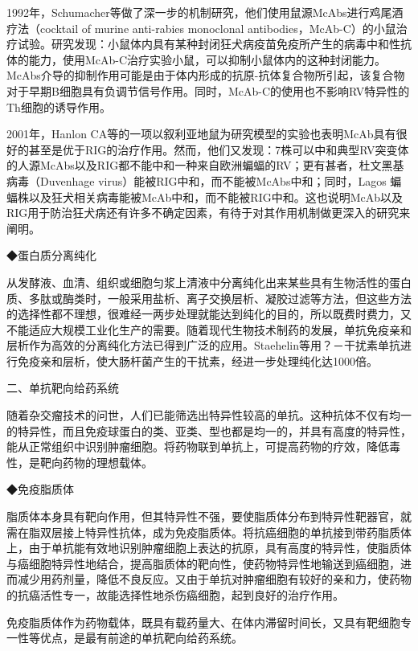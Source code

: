 1992年，Schumacher等做了深一步的机制研究，他们使用鼠源McAbs进行鸡尾酒疗法（cocktail
of murine anti-rabies monoclonal
antibodies，McAb-C）的小鼠治疗试验。研究发现：小鼠体内具有某种封闭狂犬病疫苗免疫所产生的病毒中和性抗体的能力，使用McAb-C治疗实验小鼠，可以抑制小鼠体内的这种封闭能力。McAbs介导的抑制作用可能是由于体内形成的抗原-抗体复合物所引起，该复合物对于早期B细胞具有负调节信号作用。同时，McAb-C的使用也不影响RV特异性的Th细胞的诱导作用。

2001年，Hanlon
CA等的一项以叙利亚地鼠为研究模型的实验也表明McAb具有很好的甚至是优于RIG的治疗作用。然而，他们又发现：7株可以中和典型RV突变体的人源McAbs以及RIG都不能中和一种来自欧洲蝙蝠的RV；更有甚者，杜文黑基病毒（Duvenhage
virus）能被RIG中和，而不能被McAbs中和；同时，Lagos
蝙蝠株以及狂犬相关病毒能被McAb中和，而不能被RIG中和。这也说明McAb以及RIG用于防治狂犬病还有许多不确定因素，有待于对其作用机制做更深入的研究来阐明。

◆蛋白质分离纯化

从发酵液、血清、组织或细胞匀浆上清液中分离纯化出来某些具有生物活性的蛋白质、多肽或酶类时，一般采用盐析、离子交换层析、凝胶过滤等方法，但这些方法的选择性都不理想，很难经一两步处理就能达到纯化的目的，所以既费时费力，又不能适应大规模工业化生产的需要。随着现代生物技术制药的发展，单抗免疫亲和层析作为高效的分离纯化方法已得到广泛的应用。Staehelin等用？－干扰素单抗进行免疫亲和层析，使大肠杆菌产生的干扰素，经进一步处理纯化达1000倍。

\begin{center}
    {\large 二、单抗靶向给药系统}
    \end{center}


随着杂交瘤技术的问世，人们已能筛选出特异性较高的单抗。这种抗体不仅有均一的特异性，而且免疫球蛋白的类、亚类、型也都是均一的，并具有高度的特异性，能从正常组织中识别肿瘤细胞。将药物联到单抗上，可提高药物的疗效，降低毒性，是靶向药物的理想载体。

◆免疫脂质体

脂质体本身具有靶向作用，但其特异性不强，要使脂质体分布到特异性靶器官，就需在脂双层接上特异性抗体，成为免疫脂质体。将抗癌细胞的单抗接到带药脂质体上，由于单抗能有效地识别肿瘤细胞上表达的抗原，具有高度的特异性，使脂质体与癌细胞特异性地结合，提高脂质体的靶向性，使药物特异性地输送到癌细胞，进而减少用药剂量，降低不良反应。又由于单抗对肿瘤细胞有较好的亲和力，使药物的抗癌活性专一，故能选择性地杀伤癌细胞，起到良好的治疗作用。

免疫脂质体作为药物载体，既具有载药量大、在体内滞留时间长，又具有靶细胞专一性等优点，是最有前途的单抗靶向给药系统。

